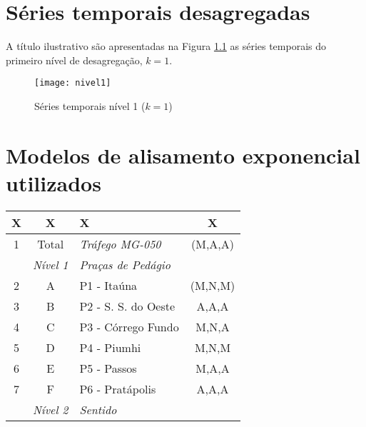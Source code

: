 \documentclass[
	12pt,				%
	openright,			%
	twoside,			%
	a4paper,			%
	english,			%
	french,				%
	spanish,			%
	brazil				%
	]{abntex2}
\begin{document}
\begin{apendicesenv}
\chapter{Séries temporais desagregadas}
\label{chap:apendice-decomposicao}

A título ilustrativo são apresentadas na Figura \ref{fig:nivel1} as séries temporais do primeiro nível de desagregação, $k=1$.

\begin{figure}[h]
\caption{\label{fig:nivel1} Séries temporais nível 1 ($k=1$)}
\centering
\texttt{[image: nivel1]}
\end{figure}



\chapter{Modelos de alisamento exponencial utilizados}
\label{chap:apendice-modelos}

\begin{longtable} {| c c l c |}
\label{tab:modelos-ets}

X & X & X & X \\
\hline
\endfirsthead

1 & Total & \emph{Tráfego MG-050} & (M,A,A) \\

 & \emph{Nível 1} & \emph{Praças de Pedágio} &  \\ 

2 & A & P1 - Itaúna & (M,N,M) \\ 
3 & B & P2 - S. S. do Oeste & A,A,A\\ 
4 & C & P3 - Córrego Fundo & M,N,A\\ 
5 & D & P4 - Piumhi & M,N,M\\ 
6 & E & P5 - Passos & M,A,A\\ 
7 & F & P6 - Pratápolis & A,A,A\\ 

 & \emph{Nível 2} & \emph{Sentido} &  \\ 


\end{longtable}
\end{apendicesenv}
\end{document}
